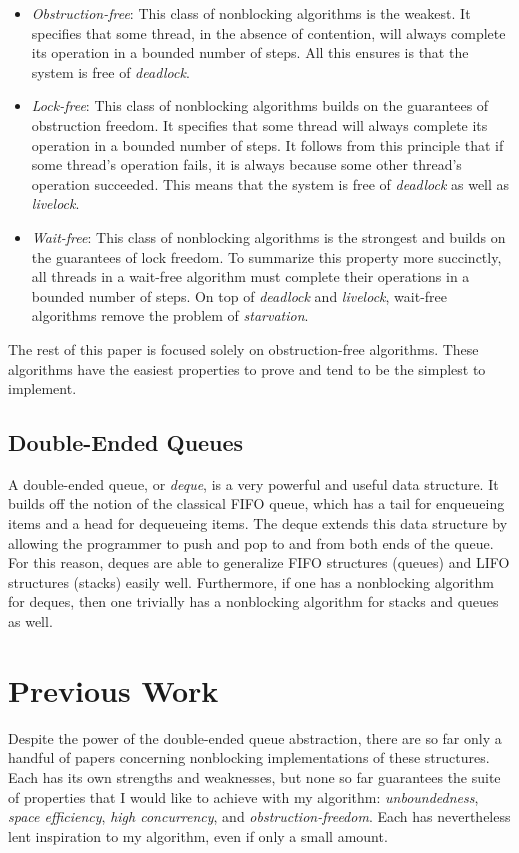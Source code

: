 \documentclass[11pt, letterpaper]{article}
\begin{document}
            \begin{itemize}
                \item \emph{Obstruction-free}: This class of nonblocking algorithms is the weakest. It specifies that some thread, in the absence of contention, will always complete its operation in a bounded number of steps. All this ensures is that the system is free of \emph{deadlock}.
                \item \emph{Lock-free}: This class of nonblocking algorithms builds on the guarantees of obstruction freedom. It specifies that some thread will always complete its operation in a bounded number of steps. It follows from this principle that if some thread's operation fails, it is always because some other thread's operation succeeded. This means that the system is free of \emph{deadlock} as well as \emph{livelock}.
                \item \emph{Wait-free}: This class of nonblocking algorithms is the strongest and builds on the guarantees of lock freedom. To summarize this property more succinctly, all threads in a wait-free algorithm must complete their operations in a bounded number of steps. On top of \emph{deadlock} and \emph{livelock}, wait-free algorithms remove the problem of \emph{starvation}.
            \end{itemize}

            The rest of this paper is focused solely on obstruction-free algorithms. These algorithms have the easiest properties to prove and tend to be the simplest to implement.

        \subsection{Double-Ended Queues}
            A double-ended queue, or \emph{deque}, is a very powerful and useful data structure. It builds off the notion of the classical FIFO queue, which has a tail for enqueueing items and a head for dequeueing items. The deque extends this data structure by allowing the programmer to push and pop to and from both ends of the queue. For this reason, deques are able to generalize FIFO structures (queues) and LIFO structures (stacks) easily well. Furthermore, if one has a nonblocking algorithm for deques, then one trivially has a nonblocking algorithm for stacks and queues as well.

    \section{Previous Work}
        Despite the power of the double-ended queue abstraction, there are so far only a handful of papers concerning nonblocking implementations of these structures. Each has its own strengths and weaknesses, but none so far guarantees the suite of properties that I would like to achieve with my algorithm: \emph{unboundedness}, \emph{space efficiency}, \emph{high concurrency}, and \emph{obstruction-freedom}. Each has nevertheless lent inspiration to my algorithm, even if only a small amount.
\end{document}

